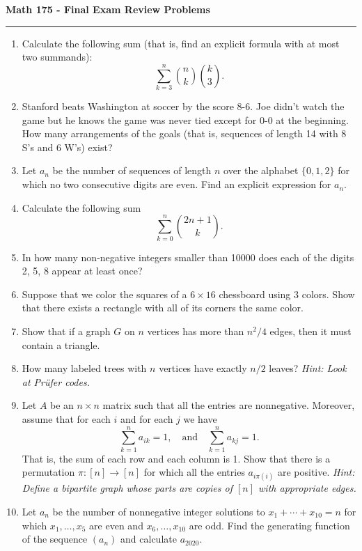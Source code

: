 \documentclass[11pt,letterpaper]{report}
\begin{document}
\begin{center}
{\bf \Large Math 175 - Final Exam Review Problems}
\vspace{0.2cm}
\hrule
\end{center}

\begin{enumerate}
	\item Calculate the following sum (that is, find an explicit formula with at most two summands):
	\[
	\sum_{k=3}^n\binom{n}{k}\binom{k}{3}.
	\]
	\item Stanford beats Washington at soccer by the score 8-6. Joe didn't watch the game but he knows the game was never tied except for 0-0 at the beginning. How many arrangements of the goals (that is, sequences of length 14 with 8 S's and 6 W's) exist?
	\item Let $a_n$ be the number of sequences of length $n$ over the alphabet $\{0, 1, 2\}$ for which no two consecutive digits are even. Find an explicit expression for $a_n$.
	\item Calculate the following sum
	\[
	\sum_{k=0}^n \binom{2n+1}{k}.
	\]
	\item In how many non-negative integers smaller than 10000 does each of the digits 2, 5, 8 appear at least once?
	\item Suppose that we color the squares of a $6\times 16$ chessboard using 3 colors. Show that there exists a rectangle with all of its corners the same color.
	\item Show that if a graph $G$ on $n$ vertices has more than $n^2/4$ edges, then it must contain a triangle.
	\item How many labeled trees with $n$ vertices have exactly $n/2$ leaves? \textit{Hint: Look at Pr\"ufer codes.}
	\item Let $A$ be an $n\times n$ matrix such that all the entries are nonnegative. Moreover, assume that for each $i$ and for each $j$ we have
	\[
	\sum_{k=1}^na_{ik} = 1,\quad\text{and}\quad\sum_{k=1}^na_{kj}=1.
	\]
	That is, the sum of each row and each column is 1. Show that there is a permutation $\pi:[n]\to [n]$ for which all the entries $a_{i\pi(i)}$ are positive. \textit{Hint: Define a bipartite graph whose parts are copies of $[n]$ with appropriate edges.}
	\item Let $a_n$ be the number of nonnegative integer solutions to $x_1 + \cdots + x_{10} = n$ for which $x_1, \ldots, x_5$ are even and $x_6, \ldots, x_{10}$ are odd. Find the generating function of the sequence $(a_n)$ and calculate $a_{2020}$.


\end{enumerate}
\end{document}
